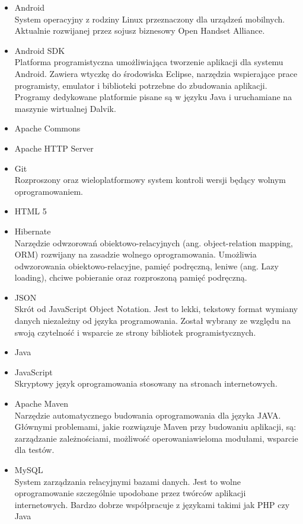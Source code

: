 \documentclass[11pt,a4paper,polish,thesis]{dcsbook}
\begin{document}
\begin{itemize}
\item{Android} \\
System operacyjny z rodziny Linux przeznaczony dla urządzeń mobilnych. Aktualnie rozwijanej przez sojusz biznesowy Open Handset Alliance.
\item{Android SDK} \\
Platforma programistyczna umożliwiająca tworzenie aplikacji dla systemu Android. Zawiera wtyczkę do środowiska Eclipse, narzędzia wspierające prace programisty, emulator i biblioteki potrzebne do zbudowania aplikacji. Programy dedykowane platformie pisane są w języku Java i uruchamiane na maszynie wirtualnej Dalvik.
\item{Apache Commons} \\
\item{Apache HTTP Server} \\
\item{Git} \\
Rozproszony oraz wieloplatformowy system kontroli wersji będący wolnym oprogramowaniem. 
\item{HTML 5} \\
\item{Hibernate} \\
Narzędzie odwzorowań obiektowo-relacyjnych (ang. object-relation mapping, ORM) rozwijany na zasadzie wolnego oprogramowania. Umożliwia odwzorowania obiektowo-relacyjne, pamięć podręczną, leniwe (ang. Lazy loading), chciwe pobieranie oraz rozproszoną pamięć podręczną.
\item{JSON} \\
Skrót od JavaScript Object Notation. Jest to lekki, tekstowy format wymiany danych niezależny od języka programowania. Został wybrany ze względu na swoją czytelność i wsparcie ze strony bibliotek programistycznych.
\item{Java} \\
\item{JavaScript} \\
Skryptowy język oprogramowania stosowany na stronach internetowych.
\item{Apache Maven} \\
Narzędzie automatycznego budowania oprogramowania dla języka JAVA. Głównymi problemami, jakie rozwiązuje Maven przy budowaniu aplikacji, są: zarządzanie zależnościami, możliwość operowaniawieloma modułami, wsparcie dla testów.
\item{MySQL} \\
System zarządzania relacyjnymi bazami danych. Jest to wolne oprogramowanie szczególnie upodobane przez twórców aplikacji internetowych. Bardzo dobrze współpracuje z językami takimi jak PHP czy Java

\end{itemize}
\end{document}
